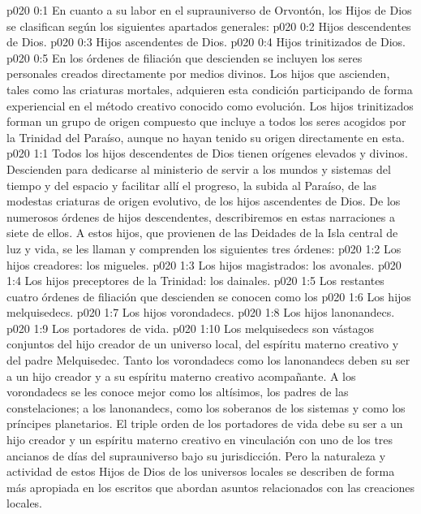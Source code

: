 \author{Perfeccionador de la sabiduría}
\vs p020 0:1 En cuanto a su labor en el suprauniverso de Orvontón, los Hijos de Dios se clasifican según los siguientes apartados generales:
\vs p020 0:2 Hijos descendentes de Dios.
\vs p020 0:3 Hijos ascendentes de Dios.
\vs p020 0:4 Hijos trinitizados de Dios.
\vs p020 0:5 \pc En los órdenes de filiación que descienden se incluyen los seres personales creados directamente por medios divinos. Los hijos que ascienden, tales como las criaturas mortales, adquieren esta condición participando de forma experiencial en el método creativo conocido como evolución. Los hijos trinitizados forman un grupo de origen compuesto que incluye a todos los seres acogidos por la Trinidad del Paraíso, aunque no hayan tenido su origen directamente en esta.
\vs p020 1:1 Todos los hijos descendentes de Dios tienen orígenes elevados y divinos. Descienden para dedicarse al ministerio de servir a los mundos y sistemas del tiempo y del espacio y facilitar allí el progreso, la subida al Paraíso, de las modestas criaturas de origen evolutivo, de los hijos ascendentes de Dios. De los numerosos órdenes de hijos descendentes, describiremos en estas narraciones a siete de ellos. A estos hijos, que provienen de las Deidades de la Isla central de luz y vida, se les llaman  y comprenden los siguientes tres órdenes:
\vs p020 1:2 Los hijos creadores: los migueles.
\vs p020 1:3 Los hijos magistrados: los avonales.
\vs p020 1:4 Los hijos preceptores de la Trinidad: los dainales.
\vs p020 1:5 \pc Los restantes cuatro órdenes de filiación que descienden se conocen como los 
\vs p020 1:6 Los hijos melquisedecs.
\vs p020 1:7 Los hijos vorondadecs.
\vs p020 1:8 Los hijos lanonandecs.
\vs p020 1:9 Los portadores de vida.
\vs p020 1:10 \pc Los melquisedecs son vástagos conjuntos del hijo creador de un universo local, del espíritu materno creativo y del padre Melquisedec. Tanto los vorondadecs como los lanonandecs deben su ser a un hijo creador y a su espíritu materno creativo acompañante. A los vorondadecs se les conoce mejor como los altísimos, los padres de las constelaciones; a los lanonandecs, como los soberanos de los sistemas y como los príncipes planetarios. El triple orden de los portadores de vida debe su ser a un hijo creador y un espíritu materno creativo en vinculación con uno de los tres ancianos de días del suprauniverso bajo su jurisdicción. Pero la naturaleza y actividad de estos Hijos de Dios de los universos locales se describen de forma más apropiada en los escritos que abordan asuntos relacionados con las creaciones locales.
